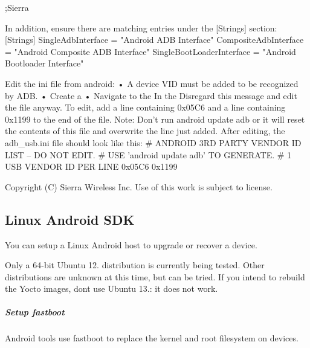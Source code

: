 \begin{DoxyVerb}
;Sierra

In addition, ensure there are matching entries under the [Strings] section:
[Strings]
SingleAdbInterface          = "Android ADB Interface"
CompositeAdbInterface       = "Android Composite ADB Interface"
SingleBootLoaderInterface   = "Android Bootloader Interface"

Edit the ini file from android:
•    A device VID must be added to be recognized by ADB.
•    Create a %
•    Navigate to the %
In the %
Disregard this message and edit the file anyway. To edit, add a line containing 0x05C6 and a line containing 0x1199 to the end of the file.
Note: Don’t run android update adb or it will reset the contents of this file and overwrite the line just added.
After editing, the adb_usb.ini file should look like this:
# ANDROID 3RD PARTY VENDOR ID LIST -- DO NOT EDIT.
# USE 'android update adb' TO GENERATE.
# 1 USB VENDOR ID PER LINE
0x05C6
0x1199
\end{DoxyVerb}






Copyright (C) Sierra Wireless Inc. Use of this work is subject to license. \hypertarget{getstartedLinuxAndroid}{}\subsection{Linux Android S\+D\+K}\label{getstartedLinuxAndroid}
You can setup a Linux Android host to upgrade or recover a device.

Only a 64-\/bit Ubuntu 12. distribution is currently being tested. Other distributions are unknown at this time, but can be tried. If you intend to rebuild the Yocto images, don\textquotesingle{}t use Ubuntu 13.\+: it does not work.\hypertarget{getstarted_linux_android_instLinuxAndroid}{}\subparagraph{Setup fastboot}\label{getstarted_linux_android_instLinuxAndroid}
Android tools use fastboot to replace the kernel and root filesystem on devices.

